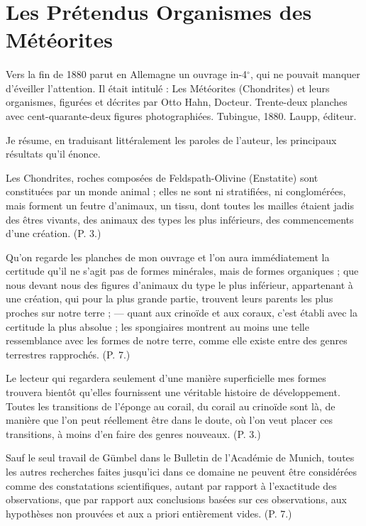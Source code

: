 \documentclass[a4paper, 12pt, oneside, french]{article}
\begin{document}
\section*{Les Prétendus Organismes des Météorites}
\pagestyle{fancy}
\fancyhf{}
\cfoot{\thepage}
\paragraph{}
Vers la fin de 1880 parut en Allemagne un ouvrage in-4$^{\circ}$, qui ne pouvait manquer d'éveiller l'attention. Il était intitulé : Les Météorites (Chondrites) et leurs organismes, figurées et décrites par Otto Hahn, Docteur. Trente-deux planches avec cent-quarante-deux figures photographiées. Tubingue, 1880. Laupp, éditeur.

Je résume, en traduisant littéralement les paroles de l'auteur, les principaux résultats qu'il énonce.

\og Les Chondrites, roches composées de Feldspath-Olivine (Enstatite) sont constituées par un monde animal ; elles ne sont ni stratifiées, ni conglomérées, mais forment un feutre d'animaux, un tissu, dont toutes les mailles étaient jadis des êtres vivants, des animaux des types les plus inférieurs, des commencements d'une création. \fg (P. 3.)

\og Qu'on regarde les planches de mon ouvrage et l'on aura immédiatement la certitude qu'il ne s'agit pas de formes minérales, mais de formes organiques ; que nous devant nous des figures d'animaux du type le plus inférieur, appartenant à une création, qui pour la plus grande partie, trouvent leurs parents les plus proches sur notre terre ; --- quant aux crinoïde et aux coraux, c'est établi avec la certitude la plus absolue ; les spongiaires montrent au moins une telle ressemblance avec les formes de notre terre, comme elle existe entre des genres terrestres rapprochés. \fg (P. 7.)

\og Le lecteur qui regardera seulement d'une manière superficielle mes formes trouvera bientôt qu'elles fournissent une véritable histoire de développement. Toutes les transitions de l'éponge au corail, du corail au crinoïde sont là, de manière que l'on peut réellement être dans le doute, où l'on veut placer ces transitions, à moins d'en faire des genres nouveaux. \fg (P. 3.)

\og Sauf le seul travail de Gümbel dans le Bulletin de l'Académie de Munich, toutes les autres recherches faites jusqu'ici dans ce domaine ne peuvent être considérées comme des constatations scientifiques, autant par rapport à l'exactitude des observations, que par rapport aux conclusions basées sur ces observations, aux hypothèses non prouvées et aux a priori entièrement vides. \fg (P. 7.)
\end{document}
